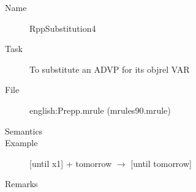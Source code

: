 \begin{description}
\vspace{1 cm}
\begin{description}
\item[Name] RppSubstitution4
\item[Task] To substitute an ADVP for its objrel VAR
\item[File] english:Prepp.mrule (mrules90.mrule)
\item[Semantics]
\item[Example] [until x1] + tomorrow $\rightarrow$ [until tomorrow]
\item[Remarks] 
\end{description}

\end{description}




